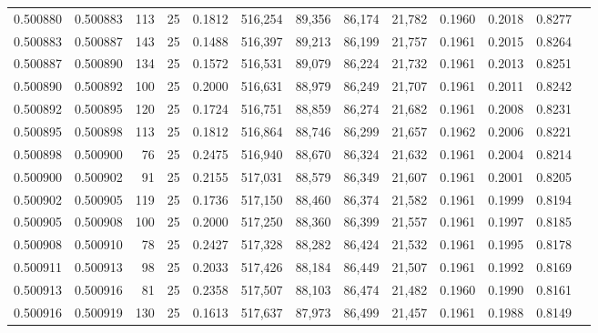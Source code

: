 \begin{tabular}{rrrrrrrrrrrrr}
0.500880 & 0.500883 & 113 &  25 &                                     0.1812 & 516,254 &  89,356 &  86,174 &  21,782 & 0.1960 & 0.2018 & 0.8277 \\
0.500883 & 0.500887 & 143 &  25 &                                     0.1488 & 516,397 &  89,213 &  86,199 &  21,757 & 0.1961 & 0.2015 & 0.8264 \\
0.500887 & 0.500890 & 134 &  25 &                                     0.1572 & 516,531 &  89,079 &  86,224 &  21,732 & 0.1961 & 0.2013 & 0.8251 \\
0.500890 & 0.500892 & 100 &  25 &                                     0.2000 & 516,631 &  88,979 &  86,249 &  21,707 & 0.1961 & 0.2011 & 0.8242 \\
0.500892 & 0.500895 & 120 &  25 &                                     0.1724 & 516,751 &  88,859 &  86,274 &  21,682 & 0.1961 & 0.2008 & 0.8231 \\
0.500895 & 0.500898 & 113 &  25 &                                     0.1812 & 516,864 &  88,746 &  86,299 &  21,657 & 0.1962 & 0.2006 & 0.8221 \\
0.500898 & 0.500900 &  76 &  25 &                                     0.2475 & 516,940 &  88,670 &  86,324 &  21,632 & 0.1961 & 0.2004 & 0.8214 \\
0.500900 & 0.500902 &  91 &  25 &                                     0.2155 & 517,031 &  88,579 &  86,349 &  21,607 & 0.1961 & 0.2001 & 0.8205 \\
0.500902 & 0.500905 & 119 &  25 &                                     0.1736 & 517,150 &  88,460 &  86,374 &  21,582 & 0.1961 & 0.1999 & 0.8194 \\
0.500905 & 0.500908 & 100 &  25 &                                     0.2000 & 517,250 &  88,360 &  86,399 &  21,557 & 0.1961 & 0.1997 & 0.8185 \\
0.500908 & 0.500910 &  78 &  25 &                                     0.2427 & 517,328 &  88,282 &  86,424 &  21,532 & 0.1961 & 0.1995 & 0.8178 \\
0.500911 & 0.500913 &  98 &  25 &                                     0.2033 & 517,426 &  88,184 &  86,449 &  21,507 & 0.1961 & 0.1992 & 0.8169 \\
0.500913 & 0.500916 &  81 &  25 &                                     0.2358 & 517,507 &  88,103 &  86,474 &  21,482 & 0.1960 & 0.1990 & 0.8161 \\
0.500916 & 0.500919 & 130 &  25 &                                     0.1613 & 517,637 &  87,973 &  86,499 &  21,457 & 0.1961 & 0.1988 & 0.8149 \\

\end{tabular}
